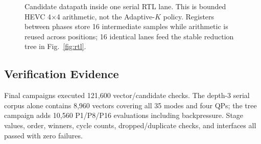 \documentclass[journal]{IEEEtran}
\begin{document}
\begin{figure}[!t]
\caption{Candidate datapath inside one serial RTL lane. This is bounded HEVC
4$\times$4 arithmetic, not the Adaptive-$K$ policy. Registers between phases
store 16 intermediate samples while arithmetic is reused across positions;
16 identical lanes feed the stable reduction tree in Fig.~\ref{fig:rtl}.}
\label{fig:lane}
\end{figure}

\subsection{Verification Evidence}
Final campaigns executed 121,600 vector/candidate checks. The depth-3 serial
corpus alone contains 8,960 vectors covering all 35 modes and four QPs; the
tree campaign adds 10,560 P1/P8/P16 evaluations including backpressure. Stage
values, order, winners, cycle counts, dropped/duplicate checks, and interfaces
all passed with zero failures.
\end{document}
